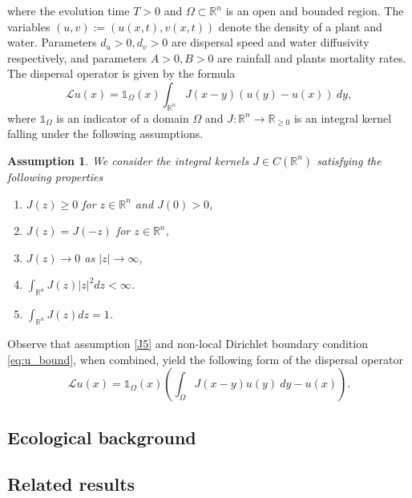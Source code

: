 \documentclass[12pt, a4paper]{article}
\makeatletter
\theoremstyle{break}
\theoremstyle{break}
\theoremstyle{break}
\newtheorem{asm}{Assumption}[section]
\theoremstyle{break}
\theoremstyle{break}
\theoremstyle{break}
\theoremstyle{break}
\newcommand{\mylabel}[2]{#2\def\@currentlabel{#2}\label{#1}}
\makeatother
\begin{document}
where the evolution time $T > 0$ and $\Omega \subset \mathbb{R}^n$ is an open and bounded region. The variables $(u, v) := (u(x,t), v(x,t))$ denote the density of a plant and water. Parameters $d_u > 0, d_v > 0$ are dispersal speed and water diffusivity respectively, and parameters $A > 0, B > 0$ are rainfall and plants mortality rates. The dispersal operator is given by the formula
\begin{equation}
    \label{eq:DispersalOperatorDefinition_1}
    \mathcal{L}u(x) = \mathds{1}_{\Omega}(x)\int_{\mathbb{R}^n} J(x-y)\left(u(y) - u(x)\right)\:dy,
\end{equation}
where $\mathds{1}_\Omega$ is an indicator of a domain $\Omega$ and $J : \mathbb{R}^n \rightarrow \mathbb{R}_{\geq 0}$ is an integral kernel falling under the following assumptions.
\begin{asm}
    \label{assumptions_general_kernel}
    We consider the integral kernels $J \in C(\mathbb{R}^n)$ satisfying the following properties
    \begin{enumerate}[label=\textnormal{(\arabic*)}]
        \item [\mylabel{J1}{(J1)}] $J(z) \geq 0$ for $z \in \mathbb{R}^n$ and $J(0) > 0$, 
        \item [\mylabel{J2}{(J2)}] $J(z) = J(-z)$ for $z \in \mathbb{R}^n$,
        \item [\mylabel{J3}{(J3)}] $J(z) \rightarrow 0$ as $|z| \rightarrow \infty$,
        \item [\mylabel{J4}{(J4)}] $\int_{\mathbb{R}^n} J(z)|z|^2dz < \infty$.
        \item [\mylabel{J5}{(J5)}] $\int_{\mathbb{R}^n} J(z) dz = 1$.
    \end{enumerate}
\end{asm}
Observe that assumption \ref{J5} and non-local Dirichlet boundary condition \eqref{eq:u_bound}, when combined, yield the following form of the dispersal operator
\begin{equation}
    \label{EQ:DispersalOperatorDefinition_2}
    \mathcal{L}u(x) = \mathds{1}_{\Omega}(x) \left(\int_{\Omega} J(x-y) u(y)\:dy - u(x)\right).
\end{equation}

\subsection{Ecological background}

\subsection{Related results}
\end{document}
